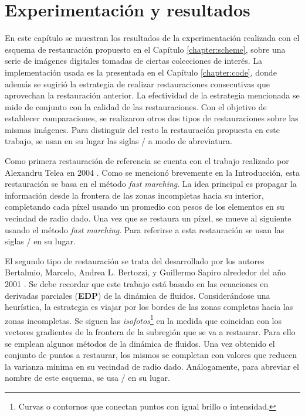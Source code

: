 \chapter{Experimentaci\'on y resultados}\label{chapter:results}

En este cap\'itulo se muestran los resultados de la experimentaci\'on realizada con el esquema de restauraci\'on propuesto en el Cap\'itulo \ref{chapter:scheme}, sobre una serie de im\'agenes digitales tomadas de ciertas colecciones de inter\'es. La implementaci\'on usada es la presentada en el Cap\'itulo \ref{chapter:code}, donde adem\'as se sugiri\'o la estrategia de realizar restauraciones consecutivas que aprovechan la restauraci\'on anterior. La efectividad de la estrategia mencionada se mide de conjunto con la calidad de las restauraciones. Con el objetivo de establecer comparaciones, se realizaron otros dos tipos de restauraciones sobre las mismas im\'agenes. Para distinguir del resto la restauraci\'on propuesta en este trabajo, se usan en su lugar las siglas \SOP/ a modo de abreviatura.

Como primera restauraci\'on de referencia se cuenta con el trabajo realizado por Alexandru Telea en 2004 \cite{telea2004image}. Como se mencion\'o brevemente en la Introducci\'on, esta restauraci\'on se basa en el m\'etodo \textit{fast marching}. La idea principal es propagar la informaci\'on desde la frontera de las zonas incompletas hacia su interior, completando cada p\'ixel usando un promedio con pesos de los elementos en su vecindad de radio dado. Una vez que se restaura un p\'ixel, se mueve al siguiente usando el m\'etodo \textit{fast marching}. Para referirse a esta restauraci\'on se usan las siglas \TELEA/ en su lugar.

El segundo tipo de restauraci\'on se trata del desarrollado por los autores Bertalmio, Marcelo, Andrea L. Bertozzi, y Guillermo Sapiro alrededor del año 2001 \cite{bertalmio2001navier}. Se debe recordar que este trabajo est\'a basado en las ecuaciones en derivadas parciales (\textbf{EDP}) de la din\'amica de fluidos. Considerándose una heur\'istica, la estrategia es viajar por los bordes de las zonas completas hacia las zonas incompletas. Se siguen las \textit{isofotos}\footnote{Curvas o contornos que conectan puntos con igual brillo o intensidad.} en la medida que coincidan con los vectores gradientes de la frontera de la subregi\'on que se va a restaurar. Para ello se emplean algunos m\'etodos de la din\'amica de fluidos. Una vez obtenido el conjunto de puntos a restaurar, los mismos se completan con valores que reducen la varianza m\'inima en su vecindad de radio dado. An\'alogamente, para abreviar el nombre de este esquema, se usa \NS/ en su lugar.

